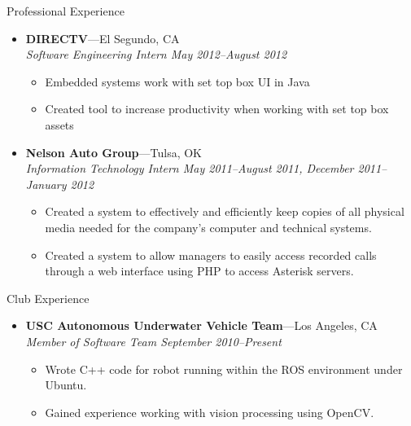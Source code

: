 \documentclass[10pt,oneside]{article}
\newenvironment{ressection}[1]{
	\vspace{4pt}
	{\fontfamily{phv}\selectfont\Large#1}
	\begin{itemize}
	\vspace{3pt}
}{
	\end{itemize}
}
\newcommand{\ressubitem}[1]{
	\vspace{-1pt}
	\item \begin{flushleft} #1 \end{flushleft}
}
\newcommand{\resbigitem}[3]{
	\vspace{-5pt}
	\item
	\textbf{#1}---#2 \\
	\textit{#3}
}
\newenvironment{ressubsec}[3]{
	\resbigitem{#1}{#2}{#3}
	\vspace{-2pt}
	\begin{itemize}
}{
	\end{itemize}
}
\begin{document}
\begin{ressection}{Professional Experience}
	\begin{comment}
	\begin{ressubsec}{Car Country}{Tulsa, OK}{Currier December 2010--January 2011 (Winter Break)}
		\ressubitem{Transported documents and payments to and from businesses and banks.}
	\end{ressubsec}
	\end{comment}
	\begin{ressubsec}{DIRECTV}{El Segundo, CA}{Software Engineering Intern May 2012--August 2012}
		\ressubitem{Embedded systems work with set top box UI in Java}
		\ressubitem{Created tool to increase productivity when working with set top box assets}
	\end{ressubsec}
	\begin{ressubsec}{Nelson Auto Group}{Tulsa, OK}{Information Technology Intern May 2011--August 2011, December 2011--January 2012}
		\ressubitem{Created a system to effectively and efficiently keep copies of all physical media needed for the company's computer and technical systems.}
		\ressubitem{Created a system to allow managers to easily access recorded calls through a web interface using PHP to access Asterisk servers.}
	\end{ressubsec}

	
	\begin{comment}
	\begin{ressubsec}{Tulsa Day Center For the Homeless}{Tulsa, OK}{Volunteer:  July 2006--September 2009}
		\ressubitem{Worked mainly with individuals receiving tuberculosis tests.}
		\ressubitem{Entered tuberculosis data and kept computerized records between the Day Center for the Homeless and the Tulsa City-County Health Department up to date.}
	\end{ressubsec}
	\end{comment}

\end{ressection}

\begin{ressection}{Club Experience}
	\begin{ressubsec}{USC Autonomous Underwater Vehicle Team}{Los Angeles, CA}{Member of Software Team September 2010--Present}
		\ressubitem{Wrote C++ code for robot running within the ROS environment under Ubuntu.}
		\ressubitem{Gained experience working with vision processing using OpenCV.}
	\end{ressubsec}
\end{ressection}
\end{document}
